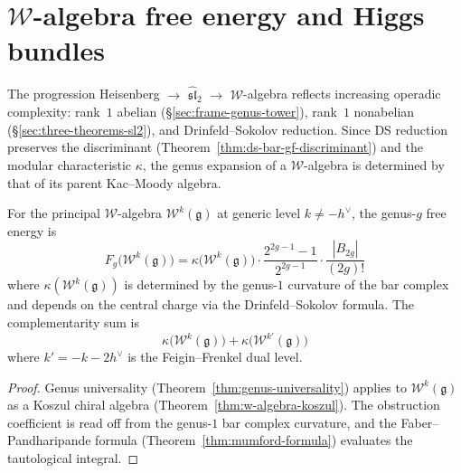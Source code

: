\section{\texorpdfstring{$\mathcal{W}$-algebra free energy and Higgs bundles}{$\mathcal{W}$-algebra free energy and Higgs bundles}}
\label{sec:w-algebra-genera}

The progression Heisenberg $\to$ $\widehat{\mathfrak{sl}}_2$ $\to$ $\mathcal{W}$-algebra reflects increasing operadic complexity: rank~$1$ abelian (\S\ref{sec:frame-genus-tower}), rank~$1$ nonabelian (\S\ref{sec:three-theorems-sl2}), and Drinfeld--Sokolov reduction.  Since DS reduction preserves the discriminant (Theorem~\ref{thm:ds-bar-gf-discriminant}) and the modular characteristic $\kappa$, the genus expansion of a $\mathcal{W}$-algebra is determined by that of its parent Kac--Moody algebra.

\begin{theorem}\label{thm:w-algebra-all-genera}
For the principal $\mathcal{W}$-algebra
$\mathcal{W}^k(\mathfrak{g})$ at generic level
$k \neq -h^\vee$, the genus-$g$ free energy is
\begin{equation}\label{eq:w-Fg-general}
F_g\bigl(\mathcal{W}^k(\mathfrak{g})\bigr)
= \kappa\bigl(\mathcal{W}^k(\mathfrak{g})\bigr)
\cdot \frac{2^{2g-1}-1}{2^{2g-1}} \cdot
\frac{|B_{2g}|}{(2g)!}
\end{equation}
where $\kappa(\mathcal{W}^k(\mathfrak{g}))$ is
determined by the genus-$1$ curvature of the bar
complex and depends on the central charge via the
Drinfeld--Sokolov formula.  The complementarity sum
is
\[
\kappa\bigl(\mathcal{W}^k(\mathfrak{g})\bigr) +
\kappa\bigl(\mathcal{W}^{k'}(\mathfrak{g})\bigr)
\]
where $k' = -k - 2h^\vee$ is the Feigin--Frenkel
dual level.
\end{theorem}

\begin{proof}
Genus universality
(Theorem~\ref{thm:genus-universality}) applies
to $\mathcal{W}^k(\mathfrak{g})$ as a Koszul
chiral algebra
(Theorem~\ref{thm:w-algebra-koszul}).
The obstruction coefficient is read off from the
genus-$1$ bar complex curvature, and the
Faber--Pandharipande formula
(Theorem~\ref{thm:mumford-formula}) evaluates
the tautological integral.
\end{proof}

